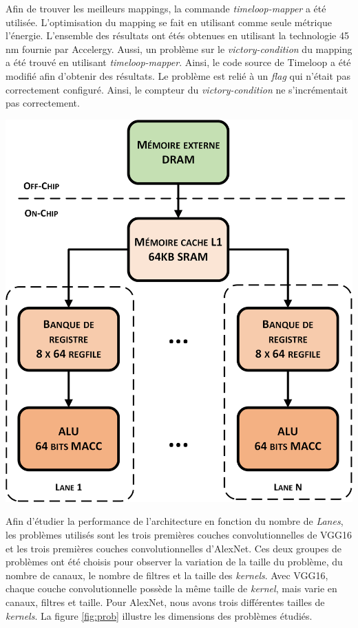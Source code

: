 \documentclass[11pt,letterpaper]{article}
\begin{document}
\begin{multicols}{2}
    Afin de trouver les meilleurs mappings, la commande \textit{timeloop-mapper} a été utilisée. 
    L'optimisation du mapping se fait en utilisant comme seule métrique l'énergie. L'ensemble des résultats
    ont étés obtenues en utilisant la technologie 45 nm fournie par Accelergy. Aussi, un problème sur le 
    \textit{victory-condition} du mapping a été trouvé en utilisant \textit{timeloop-mapper}. Ainsi, le code
    source de Timeloop a été modifié afin d'obtenir des résultats. Le problème est relié à un \textit{flag} 
    qui n'était pas correctement configuré. Ainsi, le compteur du \textit{victory-condition} ne s'incrémentait
    pas correctement.

    {\centering
    \includegraphics[width=0.8\linewidth]{arch_visio.png}
    \captionsetup{hypcap=false}
    \label{fig:timeloop_arch}}
    \bigskip

    Afin d'étudier la performance de l'architecture en fonction du nombre de \textit{Lanes}, 
    les problèmes utilisés sont les trois premières couches convolutionnelles de VGG16 et 
    les trois premières couches convolutionnelles d'AlexNet. Ces deux groupes de problèmes 
    ont été choisis pour observer la variation de la taille du problème, du nombre de canaux, 
    le nombre de filtres et la taille des \textit{kernels}. Avec VGG16, chaque couche convolutionnelle 
    possède la même taille de \textit{kernel}, mais varie en canaux, filtres et taille. Pour 
    AlexNet, nous avons trois différentes tailles de \textit{kernels}. La figure \ref{fig:prob} 
    illustre les dimensions des problèmes étudiés.
    

\end{multicols}
\end{document}
